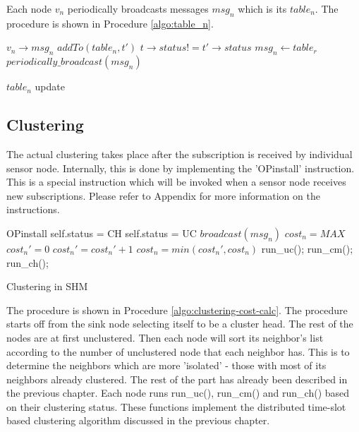 Each node \(v_n\) periodically broadcasts messages \(msg_n\) which is its \(table_n\). The procedure is shown in Procedure \ref{algo:table_n}.

\begin{algorithm}
\begin{algorithmic}[1]
\REQUIRE \(v_n\rightarrow msg_n\)
			\STATE \(addTo(table_n, t')\)
		\ENDIF
				\STATE \(t\rightarrow status != t'\rightarrow status\)
			\ENDIF
		\ENDFOR
	\ENDFOR
	\STATE \(msg_n \gets table_r\)
	\STATE \(periodically\_broadcast(msg_n)\)
\end{algorithmic}
\caption{\(table_n\) update}
\label{algo:table_n}
\end{algorithm}

\subsection{Clustering}
The actual clustering takes place after the subscription is received by individual sensor node. Internally, this is done by implementing the 'OPinstall' instruction. This is a special instruction which will be invoked when a sensor node receives new subscriptions. Please refer to Appendix for more information on the instructions.

\begin{algorithm}
\begin{algorithmic}[1]
\REQUIRE OPinstall
		\STATE self.status = CH
	\ELSE
		\STATE self.status = UC
	\ENDIF
		\STATE \(broadcast(msg_n)\)
		\STATE \(cost_n = MAX\)
			\STATE \(cost_n' = 0\)
					\STATE \(cost_n' = cost_n' + 1\)
				\ENDIF
			\ENDFOR
			\STATE \(cost_n = min(cost_n', cost_n)\)
		\ENDFOR
		\STATE run\_uc();
	\ENDWHILE
		\STATE run\_cm();
	\ELSE
		\STATE run\_ch();
	\ENDIF
\end{algorithmic}\caption{Clustering in SHM}
\label{algo:clustering-cost-calc}
\end{algorithm}

The procedure is shown in Procedure \ref{algo:clustering-cost-calc}. The procedure starts off from the sink node selecting itself to be a cluster head. The rest of the nodes are at first unclustered. Then each node will sort its neighbor's list according to the number of unclustered node that each neighbor has. This is to determine the neighbors which are more 'isolated' - those with most of its neighbors already clustered. The rest of the part has already been described in the previous chapter. Each node runs run\_uc(), run\_cm() and run\_ch() based on their clustering status. These functions implement the distributed time-slot based clustering algorithm discussed in the previous chapter.